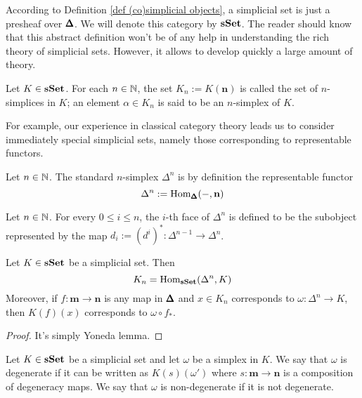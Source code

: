 \begin{refsection}
According to Definition \ref{def (co)simplicial objects}, a simplicial set is just a presheaf over $\pmb{\Delta}$. We will denote this category by $\mathbf{s\,\!\mathbf{Set}}$. The reader should know that this abstract definition won't be of any help in understanding the rich theory of simplicial sets. However, it allows to develop quickly a large amount of theory.

\begin{defin}
Let $K \in \mathbf{s\,\!\mathbf{Set}}$. For each $n \in \mathbb{N}$, the set $K_n := K(\mathbf n)$ is called the set of $n$-simplices in $K$; an element $\alpha \in K_n$ is said to be an $n$-simplex of $K$.
\end{defin}

For example, our experience in classical category theory leads us to consider immediately special simplicial sets, namely those corresponding to representable functors.

\begin{defin}
Let $n \in \mathbb{N}$. The standard $n$-simplex $\Delta^n$ is by definition the representable functor
\[
\Delta^n := \mathrm{Hom}_{\pmb{\Delta}}(-,\mathbf n)
\]
\end{defin}

\begin{defin} \label{def face}
Let $n \in \mathbb{N}$. For every $0 \le i \le n$, the $i$-th face of $\Delta^n$ is defined to be the subobject represented by the map $d_i := (d^i)^* \colon \Delta^{n-1} \to \Delta^n$.
\end{defin}

\begin{prop} \label{prop simplicial morphisms with Yoneda identification}
Let $K \in \mathbf{s\,\!\mathbf{Set}}$ be a simplicial set. Then
\[
K_n = \mathrm{Hom}_{\mathbf{s\,\!\mathbf{Set}}}(\Delta^n,K)
\]
Moreover, if $f \colon \mathbf m \to \mathbf n$ is any map in $\pmb{\Delta}$ and $x \in K_n$ corresponds to $\omega \colon \Delta^n \to K$, then $K(f)(x)$ corresponds to $\omega \circ f_*$.
\end{prop}

\begin{proof}
It's simply Yoneda lemma.
\end{proof}

\begin{defin}
Let $K \in \mathbf{s\,\!\mathbf{Set}}$ be a simplicial set and let $\omega$ be a simplex in $K$. We say that $\omega$ is degenerate if it can be written as $K(s)(\omega')$ where $s \colon \mathbf m \to \mathbf n$ is a composition of degeneracy maps. We say that $\omega$ is non-degenerate if it is not degenerate.
\end{defin}


\end{refsection}
